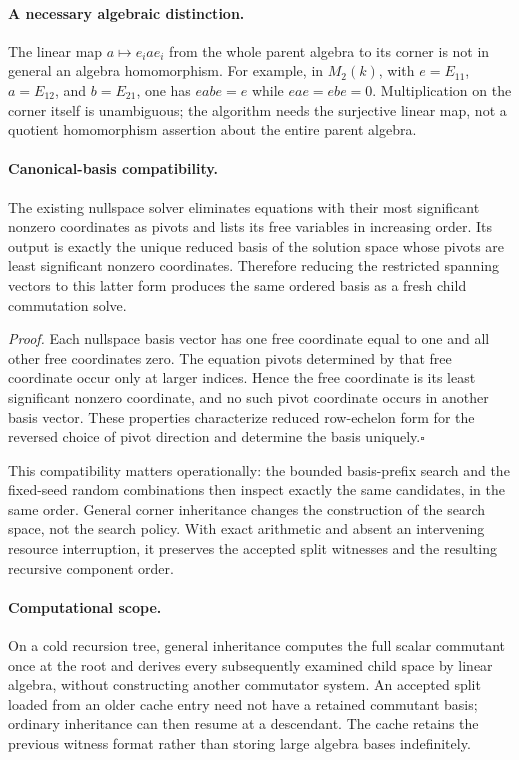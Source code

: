 \paragraph{A necessary algebraic distinction.}
The linear map $a\mapsto e_i a e_i$ from the whole parent algebra to its
corner is not in general an algebra homomorphism. For example, in
$M_2(k)$, with $e=E_{11}$, $a=E_{12}$, and $b=E_{21}$, one has
$eabe=e$ while $eae=ebe=0$. Multiplication on the corner itself is
unambiguous; the algorithm needs the surjective linear map, not a quotient
homomorphism assertion about the entire parent algebra.

\paragraph{Canonical-basis compatibility.}
The existing nullspace solver eliminates equations with their most
significant nonzero coordinates as pivots and lists its free variables in
increasing order. Its output is exactly the unique reduced basis of the
solution space whose pivots are least significant nonzero coordinates.
Therefore reducing the restricted spanning vectors to this latter form
produces the same ordered basis as a fresh child commutation solve.

\emph{Proof.}
Each nullspace basis vector has one free coordinate equal to one and all
other free coordinates zero. The equation pivots determined by that free
coordinate occur only at larger indices. Hence the free coordinate is its
least significant nonzero coordinate, and no such pivot coordinate occurs
in another basis vector. These properties characterize reduced row-echelon
form for the reversed choice of pivot direction and determine the basis
uniquely.\hfill$\square$

This compatibility matters operationally: the bounded basis-prefix search
and the fixed-seed random combinations then inspect exactly the same
candidates, in the same order. General corner inheritance changes the
construction of the search space, not the search policy. With exact
arithmetic and absent an intervening resource interruption, it preserves
the accepted split witnesses and the resulting recursive component order.

\paragraph{Computational scope.}
On a cold recursion tree, general inheritance computes the full scalar
commutant once at the root and derives every subsequently examined child
space by linear algebra, without constructing another commutator system.
An accepted split loaded from an older cache entry need not have a retained
commutant basis; ordinary inheritance can then resume at a descendant.
The cache retains the previous witness format rather than storing large
algebra bases indefinitely.

